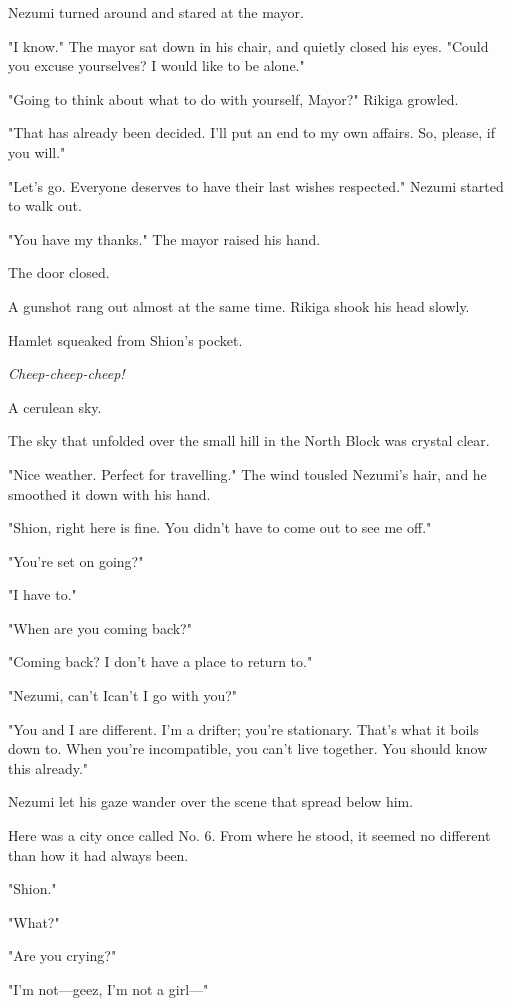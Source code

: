 Nezumi turned around and stared at the mayor.

"I know." The mayor sat down in his chair, and quietly closed his eyes.
"Could you excuse yourselves? I would like to be alone."

"Going to think about what to do with yourself, Mayor?" Rikiga growled.

"That has already been decided. I'll put an end to my own affairs. So,
please, if you will."

"Let's go. Everyone deserves to have their last wishes respected."
Nezumi started to walk out.

"You have my thanks." The mayor raised his hand.

The door closed.

A gunshot rang out almost at the same time. Rikiga shook his head
slowly.

Hamlet squeaked from Shion's pocket.

\emph{Cheep-cheep-cheep!}

\myspace

A cerulean sky.

The sky that unfolded over the small hill in the North Block was crystal
clear.

"Nice weather. Perfect for travelling." The wind tousled Nezumi's hair,
and he smoothed it down with his hand.

"Shion, right here is fine. You didn't have to come out to see me off."

"\el You're set on going?"

"I have to."

"When are you coming back?"

"Coming back? I don't have a place to return to."

"Nezumi, can't I\el can't I go with you?"

"You and I are different. I'm a drifter; you're stationary. That's what
it boils down to. When you're incompatible, you can't live together. You
should know this already."

Nezumi let his gaze wander over the scene that spread below him.

Here was a city once called No. 6. From where he stood, it seemed no
different than how it had always been.

"Shion."

"What?"

"Are you crying?"

"I'm not---geez, I'm not a girl---"

